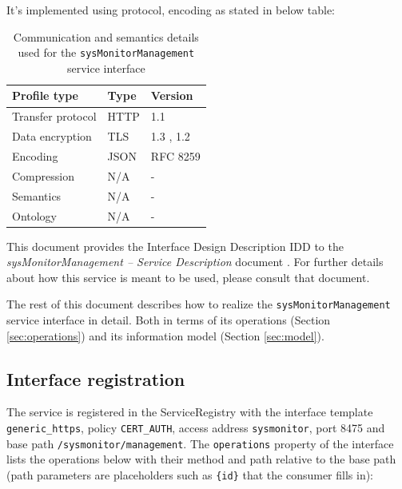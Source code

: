 \documentclass[a4paper]{arrowhead}
\begin{document}
It's implemented using protocol, encoding as stated in below table:
\begin{table}[ht!]
  \centering
  \begin{tabular}{|l|l|l|}
    \hline
    \rowcolor{gray!33} Profile type & Type & Version \\ \hline
    Transfer protocol & HTTP & 1.1 \cite{rfc9112} \\ \hline
    Data encryption & TLS & 1.3 \cite{rfc8446}, 1.2 \cite{rfc5246} \\ \hline
    Encoding & JSON & RFC 8259 \cite{rfc8259} \\ \hline
    Compression & N/A & - \\ \hline
    Semantics & N/A & - \\ \hline
    Ontology & N/A & - \\ \hline
  \end{tabular}
  \caption{Communication and semantics details used for the \texttt{sys\allowbreak{}Monitor\allowbreak{}Management} service interface}
  \label{tab:comunication_semantics_profile}
\end{table}

This document provides the Interface Design Description IDD to the \textit{sysMonitorManagement -- Service Description} document \cite{smo-sysMonitorManagement-sd}.
For further details about how this service is meant to be used, please consult that document.

The rest of this document describes how to realize the \texttt{sys\allowbreak{}Monitor\allowbreak{}Management} service
interface in detail. Both in terms of its operations (Section \ref{sec:operations}) and its information model (Section \ref{sec:model}).

\subsection{Interface registration}

The service is registered in the ServiceRegistry with the interface template \texttt{generic\_\allowbreak{}https}, policy \texttt{CERT\_\allowbreak{}AUTH}, access address \texttt{sysmonitor}, port 8475 and base path \texttt{/\allowbreak{}sysmonitor/\allowbreak{}management}. The \texttt{operations} property of the interface lists the operations below with their method and path relative to the base path (path parameters are placeholders such as \texttt{\{id\}} that the consumer fills in):
\end{document}
